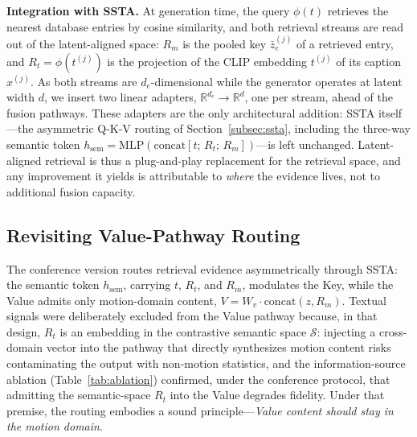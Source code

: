 \documentclass[10pt,journal,compsoc]{IEEEtran}
\newcommand{\myparagraph}[1]{\textbf{#1}\hspace{1.8ex}}
\begin{document}
\noindent \myparagraph{Integration with SSTA.}
At generation time, the query $\phi(t)$ retrieves the nearest database entries by cosine similarity, and both retrieval streams are read out of the latent-aligned space: $R_m$ is the pooled key $\bar{z}_e^{(j)}$ of a retrieved entry, and $R_t = \phi(t^{(j)})$ is the projection of the CLIP embedding $t^{(j)}$ of its caption $x^{(j)}$. As both streams are $d_e$-dimensional while the generator operates at latent width $d$, we insert two linear adapters, $\mathbb{R}^{d_e} \rightarrow \mathbb{R}^{d}$, one per stream, ahead of the fusion pathways. These adapters are the only architectural addition: SSTA itself---the asymmetric Q-K-V routing of Section~\ref{subsec:ssta}, including the three-way semantic token $h_{\mathrm{sem}} = \mathrm{MLP}(\mathrm{concat}[t;\, R_t;\, R_m])$---is left unchanged. Latent-aligned retrieval is thus a plug-and-play replacement for the retrieval space, and any improvement it yields is attributable to \emph{where} the evidence lives, not to additional fusion capacity.

\subsection{Revisiting Value-Pathway Routing}
\label{subsec:vroute}

The conference version routes retrieval evidence asymmetrically through SSTA: the semantic token $h_{\mathrm{sem}}$, carrying $t$, $R_t$, and $R_m$, modulates the Key, while the Value admits only motion-domain content, $V = W_v \cdot \mathrm{concat}(z, R_m)$. Textual signals were deliberately excluded from the Value pathway because, in that design, $R_t$ is an embedding in the contrastive semantic space $\mathcal{S}$: injecting a cross-domain vector into the pathway that directly synthesizes motion content risks contaminating the output with non-motion statistics, and the information-source ablation (Table~\ref{tab:ablation}) confirmed, under the conference protocol, that admitting the semantic-space $R_t$ into the Value degrades fidelity. Under that premise, the routing embodies a sound principle---\emph{Value content should stay in the motion domain}.
\end{document}
